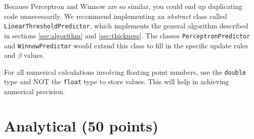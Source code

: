 \documentclass[11pt]{article}
\newcommand{\code}[1]{{\footnotesize \tt #1}}
\begin{document}
Because Perceptron and Winnow are so similar, you could end up duplicating code unnecessarily. We recommend implementing an {\em abstract} class called \code{LinearThresholdPredictor}, which implements the general algorithm described in sections \ref{sec:algorithm} and \ref{sec:thickness}. The classes \code{PerceptronPredictor} and \code{WinnowPredictor} would extend this class to fill in the specific update rules and $\beta$ values.

For all numerical calculations involving floating point numbers, use the {\tt double} type and NOT the {\tt float} type to store values.
This will help in achieving numerical precision.



\section{Analytical (50 points)}
\end{document}

